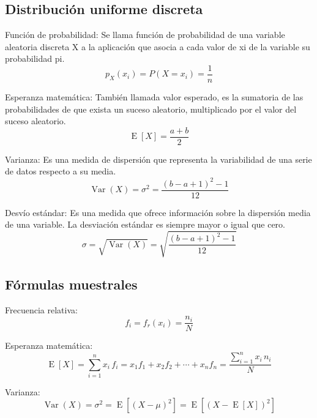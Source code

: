 \subsection{Distribución uniforme discreta}
Función de probabilidad:
Se llama función de probabilidad de una variable aleatoria discreta X a la aplicación que asocia a cada valor de xi de la variable su probabilidad pi.
\begin{equation}
p_X(x_i) = P(X = x_i) = \frac{1}{n}
\end{equation}

Esperanza matemática:
También llamada valor esperado, es la sumatoria de las probabilidades de que exista un suceso aleatorio, multiplicado por el valor del suceso aleatorio.
\begin{equation}
\operatorname{E}[X] = \frac{a+b}{2}
\end{equation}

Varianza:
Es una medida de dispersión que representa la variabilidad de una serie de datos respecto a su media.
\begin{equation}
\operatorname{Var}(X) = \sigma^{2} = \frac{(b-a+1)^{2}-1}{12}
\end{equation}

Desvío estándar:
Es una medida que ofrece información sobre la dispersión media de una variable. La desviación estándar es siempre mayor o igual que cero.
\begin{equation}
\sigma = \sqrt{\operatorname{Var}(X)} = \sqrt{\frac{(b-a+1)^{2}-1}{12}}
\end{equation}

\subsection{Fórmulas muestrales}
Frecuencia relativa:
\begin{equation}
f_{i} = f_{r}(x_{i}) = \frac {n_{i}}{N}
\end{equation}

Esperanza matemática:
\begin{equation}
\operatorname{E}[X] = \sum_{i=1}^{n}x_{i}\,f_{i}=x_{1}f_{1}+x_{2}f_{2}+\cdots +x_{n}f_{n} = \frac{\sum_{i=1}^{n}x_{i}\,n_{i}}{N}
\end{equation}

Varianza:
\begin{equation}
\operatorname{Var}(X) = \sigma^{2} = \operatorname{E}\left[(X - \mu)^{2}\right] = \operatorname{E}\left[(X - \operatorname{E}[X])^{2}\right]
\end{equation}

